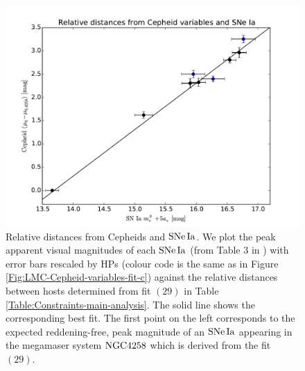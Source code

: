 \begin{figure}[hbtp]
\centering
\includegraphics[width=\textwidth]{figures/chapter-h0/effective_HP_SNIa.pdf}
\caption{Relative distances from Cepheids and $\mathrm{SNe\,Ia}$. We plot the peak apparent visual magnitudes of each $\mathrm{SNe\,Ia}$ (from Table 3 in \cite{Riess:2011yx}) with error bars rescaled by HPs (colour code is the same as in Figure \ref{Fig:LMC-Cepheid-variables-fit-c}) against the relative distances between hosts determined from fit $(29)$ in Table \ref{Table:Constraints-main-analysis}. The solid line shows the corresponding best fit. The first point on the left corresponds to the expected reddening-free, peak magnitude of an $\mathrm{SNe\,Ia}$ appearing in the megamaser system $\mathrm{NGC4258}$ which is derived from the fit $(29)$. }
\label{Fig:HP-SNIa-main-analysis}
\end{figure}

